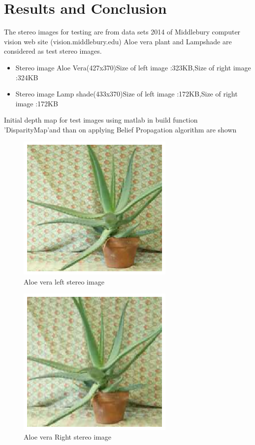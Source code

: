 \section{Results and Conclusion}
The  stereo images for testing are from  data sets 2014 of Middlebury computer vision web site (vision.middlebury.edu)
Aloe vera plant and Lampshade are considered as test stereo images.
\begin{itemize}
  \item Stereo image Aloe Vera(427x370)Size of left image :323KB,Size of right  image :324KB
  \item Stereo image Lamp shade(433x370)Size of left image :172KB,Size of right  image :172KB
\end{itemize}

Initial depth map for test images using matlab in build function 'DisparityMap'and than on applying  Belief Propagation algorithm are  shown

\begin{figure}[h]
\centering
\includegraphics[width=3in]{leftal.eps}
\caption{Aloe vera left stereo image} \label{lined}
\end{figure}

\begin{figure}
\begin{center}
\includegraphics[width=3in]{rightal.eps}
\caption{Aloe vera Right stereo image} \label{lined}
\end{center}
\end{figure}


